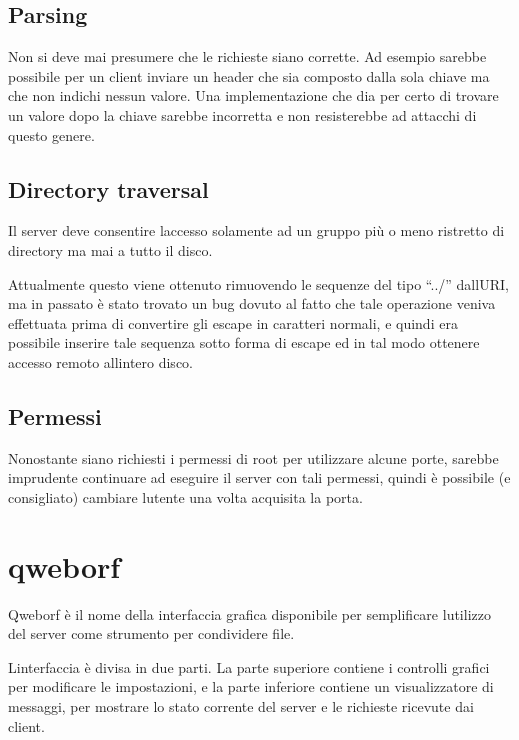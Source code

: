 \documentclass[a4paper,11pt]{article}
\begin{document}
\subsection{Parsing}
{\sffamily
Non si deve mai presumere che le richieste siano corrette. Ad esempio
sarebbe possibile per un client inviare un header che sia composto
dalla sola chiave ma che non indichi nessun valore. Una implementazione
che dia per certo di trovare un valore dopo la chiave sarebbe
incorretta e non resisterebbe ad attacchi di questo genere.}

\subsection{Directory traversal}
{\sffamily
Il server deve consentire l{\textquotesingle}accesso solamente ad un
gruppo pi\`u o meno ristretto di directory ma mai a tutto il disco.}

{\sffamily
Attualmente questo viene ottenuto rimuovendo le sequenze del tipo
{\textquotedblleft}../{\textquotedblright} dall{\textquotesingle}URI,
ma in passato \`e stato trovato un bug dovuto al fatto che tale
operazione veniva effettuata prima di convertire gli escape in
caratteri normali, e quindi era possibile inserire tale sequenza sotto
forma di escape ed in tal modo ottenere accesso remoto
all{\textquotesingle}intero disco\cite{BUG01}. }

\subsection{Permessi}
{\sffamily
Nonostante siano richiesti i permessi di root per utilizzare alcune
porte, sarebbe imprudente continuare ad eseguire il server con tali
permessi, quindi \`e possibile (e consigliato) cambiare
l{\textquotesingle}utente una volta acquisita la porta.}

\section{qweborf}
{\sffamily
Qweborf \`e il nome della interfaccia grafica disponibile per
semplificare l{\textquotesingle}utilizzo del server come strumento per
condividere file.}

{\sffamily
L{\textquotesingle}interfaccia \`e divisa in due parti. La parte
superiore contiene i controlli grafici per modificare le impostazioni,
e la parte inferiore contiene un visualizzatore di messaggi, per
mostrare lo stato corrente del server e le richieste ricevute dai
client.}
\end{document}
